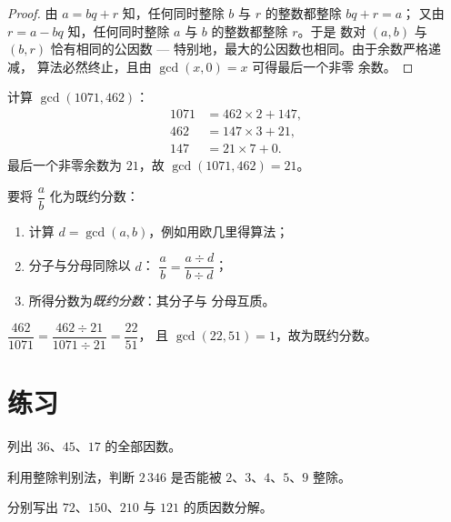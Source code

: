 \begin{proof}
由 $a = bq + r$ 知，任何同时整除 $b$ 与 $r$ 的整数都整除 $bq + r = a$；
又由 $r = a - bq$ 知，任何同时整除 $a$ 与 $b$ 的整数都整除 $r$。于是
数对 $(a, b)$ 与 $(b, r)$ 恰有相同的公因数 ---
特别地，最大的公因数也相同。由于余数严格递减，
算法必然终止，且由 $\gcd(x, 0) = x$ 可得最后一个非零
余数。
\end{proof}

\begin{example}\label{ex:g9:arith:euclidalgo}
计算 $\gcd(1071, 462)$：
\begin{align*}
1071 &= 462 \times 2 + 147, \\
462 &= 147 \times 3 + 21, \\
147 &= 21 \times 7 + 0 .
\end{align*}
最后一个非零余数为 $21$，故 $\gcd(1071, 462) = 21$。
\end{example}

\begin{method}[彻底约分]\label{met:g9:arith:simplify}
要将 $\dfrac ab$ 化为既约分数：
\begin{enumerate}
  \item 计算 $d = \gcd(a, b)$，例如用欧几里得算法；
  \item 分子与分母同除以 $d$：
        $\dfrac ab = \dfrac{a \div d}{b \div d}$；
  \item 所得分数为\emph{既约分数}：其分子与
        分母互质。
\end{enumerate}
\end{method}

\begin{example}
$\dfrac{462}{1071} = \dfrac{462 \div 21}{1071 \div 21} = \dfrac{22}{51}$，
且 $\gcd(22, 51) = 1$，故为既约分数。
\end{example}

\section{练习}

\begin{exercise}[$\star$]\label{exo:g9:arith:1}
列出 $36$、$45$、$17$ 的全部因数。
\end{exercise}

\begin{exercise}[$\star$]\label{exo:g9:arith:2}
利用整除判别法，判断 $2\,346$ 是否能被
$2$、$3$、$4$、$5$、$9$ 整除。
\end{exercise}

\begin{exercise}[$\star$]\label{exo:g9:arith:3}
分别写出 $72$、$150$、$210$ 与 $121$ 的质因数分解。
\end{exercise}

